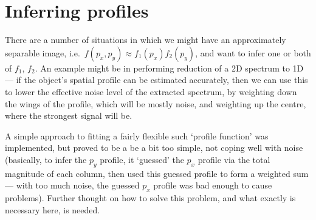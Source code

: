 \section{Inferring profiles}
\label{sec:profileInference}

There are a number of situations in which we might have an approximately
separable image, i.e.\ $f(p_x, p_y) \approx f_1(p_x)f_2(p_y)$, and want
to infer one or both of $f_1$, $f_2$. An example might be in performing
reduction of a 2D spectrum to 1D --- if the object's spatial profile can
be estimated accurately, then we can use this to lower the effective
noise level of the extracted spectrum, by weighting down the wings of
the profile, which will be mostly noise, and weighting up the centre,
where the strongest signal will be.

A simple approach to fitting a fairly flexible such `profile function'
was implemented, but proved to be a be a bit too simple, not coping well
with noise (basically, to infer the $p_y$ profile, it `guessed' the
$p_x$ profile via the total magnitude of each column, then used this
guessed profile to form a weighted sum --- with too much noise, the
guessed $p_x$ profile was bad enough to cause problems). Further thought
on how to solve this problem, and what exactly is necessary here,
is needed.
